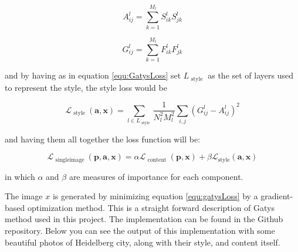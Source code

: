 \documentclass[12pt, a4paper]{scrartcl}
\begin{document}
\begin{equation} \label{equ:gramMatrices1}
	A _ { i j } ^ { l } = \sum _ { k = 1 } ^ { M _ { l } } S _ { i k } ^ { l } S _ { j k } ^ { l }
\end{equation}

\begin{equation} \label{equ:gramMatrices2}
	G _ { i j } ^ { l } = \sum _ { k = 1 } ^ { M _ { l } } F _ { i k } ^ { l } F _ { j k } ^ { l }
\end{equation}

and by having as in equation \ref{equ:GatysLoss} set ${ L } _ { \text { style } } $ as the set of layers used to represent the style, the style loss would be

\begin{equation} \label{equ:gatysStyleLoss}
\mathcal { L } _ {\text { style } } ( \boldsymbol { a } , \boldsymbol { x } ) = \sum _ { l \in L _ {\text { style } } } \frac { 1 } { N _ { l } ^ { 2 } M _ { l } ^ { 2 } } \sum _ { i , j } \left( G _ { i j } ^ { l } - A _ { i j } ^ { l } \right) ^ { 2 }
\end{equation}

and having them all together the loss function will be:

\begin{equation} \label{equ:gatysLoss}
\mathcal { L } _ { \text { singleimage } } ( \boldsymbol { p } , \boldsymbol { a } , \boldsymbol { x } ) = \alpha \mathcal { L } _ { \text { content } } ( \boldsymbol { p } , \boldsymbol { x } ) + \beta \mathcal { L } _ { \text {style} } ( \boldsymbol { a } , \boldsymbol { x } )
\end{equation}

in which $\alpha$ and $\beta$ are measures of importance for each component.

The image $x$ is generated by minimizing equation \ref{equ:gatysLoss} by a gradient-based optimization method. This is a straight forward description of Gatys method used in this project. The implementation can be found in the Github repository. Below you can see the output of this implementation with some beautiful photos of Heidelberg city, along with their style, and content itself.


\end{document}

